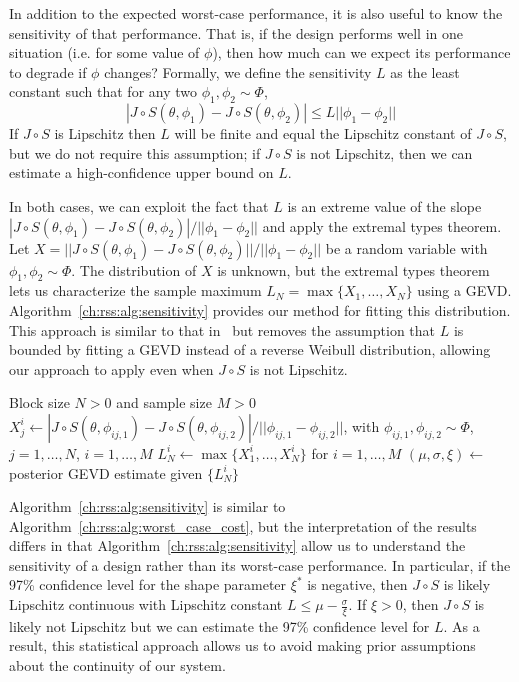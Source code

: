 In addition to the expected worst-case performance, it is also useful to know the sensitivity of that performance. That is, if the design performs well in one situation (i.e. for some value of $\phi$), then how much can we expect its performance to degrade if $\phi$ changes? Formally, we define the sensitivity $L$ as the least constant such that for any two $\phi_1, \phi_2 \sim \Phi$, $$|J\circ S(\theta, \phi_1) - J\circ S(\theta, \phi_2)| \leq L ||\phi_1 - \phi_2||$$
If $J \circ S$ is Lipschitz then $L$ will be finite and equal the Lipschitz constant of $J \circ S$, but we do not require this assumption; if $J \circ S$ is not Lipschitz, then we can estimate a high-confidence upper bound on $L$.

In both cases, we can exploit the fact that $L$ is an extreme value of the slope $|J\circ S(\theta, \phi_1) - J\circ S(\theta, \phi_2)| / ||\phi_1 - \phi_2||$ and apply the extremal types theorem. Let $X = ||J\circ S(\theta, \phi_1) - J\circ S(\theta, \phi_2)|| / ||\phi_1 - \phi_2||$ be a random variable with $\phi_1, \phi_2 \sim \Phi$. The distribution of $X$ is unknown, but the extremal types theorem lets us characterize the sample maximum $L_N = \max\{X_1, \ldots, X_N\}$ using a GEVD. Algorithm~\ref{ch:rss:alg:sensitivity} provides our method for fitting this distribution. This approach is similar to that in~\cite{sridhar2021improving,knuthPlanningLearnedDynamics2021} but removes the assumption that $L$ is bounded by fitting a GEVD instead of a reverse Weibull distribution, allowing our approach to apply even when $J\circ S$ is not Lipschitz.
\begin{algorithm}
	\caption{An algorithm for estimating the parameters of a GEVD governing the sensitivity of $J \circ S$}\label{ch:rss:alg:sensitivity}
	\begin{algorithmic}
		\Require Block size $N > 0$ and sample size $M > 0$
		\State $X_j^i \gets |J\circ S(\theta, \phi_{ij,1}) - J\circ S(\theta, \phi_{ij,2})| / ||\phi_{ij,1} - \phi_{ij,2}||$, \hspace{2cm} \phantom{xxxxxxx} with $\phi_{ij,1}, \phi_{ij,2} \sim\Phi$, $j=1,\ldots,N$, $i=1,\ldots,M$
		\State $L_N^i \gets \max\{X_1^i, \ldots, X_N^i\}$ for $i=1,\ldots,M$
		\State $(\mu, \sigma, \xi) \gets$ posterior GEVD estimate given $\{L_N^i\}$
	\end{algorithmic}
\end{algorithm}

Algorithm~\ref{ch:rss:alg:sensitivity} is similar to Algorithm~\ref{ch:rss:alg:worst_case_cost}, but the interpretation of the results differs in that Algorithm~\ref{ch:rss:alg:sensitivity} allow us to understand the sensitivity of a design rather than its worst-case performance. In particular, if the 97\% confidence level for the shape parameter $\xi^*$ is negative, then $J\circ S$ is likely Lipschitz continuous with Lipschitz constant $L \leq \mu - \frac{\sigma}{\xi}$. If $\xi > 0$, then $J\circ S$ is likely not Lipschitz but we can estimate the 97\% confidence level for $L$. As a result, this statistical approach allows us to avoid making prior assumptions about the continuity of our system.

